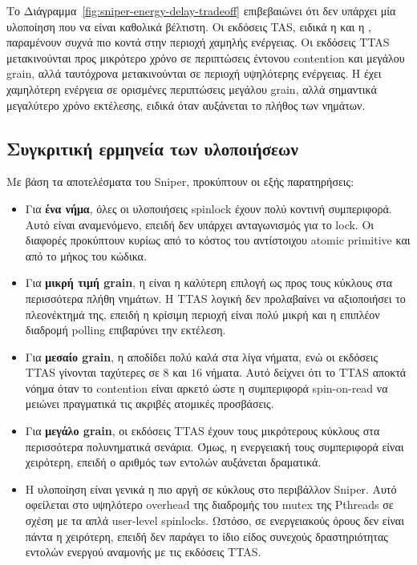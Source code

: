 \documentclass{article}
\newcommand{\code}[1]{\texttt{\detokenize{#1}}}
\begin{document}
Το Διάγραμμα~\ref{fig:sniper-energy-delay-tradeoff} επιβεβαιώνει ότι δεν υπάρχει μία υλοποίηση που να είναι καθολικά βέλτιστη. Οι εκδόσεις TAS, ειδικά η \code{TAS_CAS} και η \code{TAS_TS}, παραμένουν συχνά πιο κοντά στην περιοχή χαμηλής ενέργειας. Οι εκδόσεις TTAS μετακινούνται προς μικρότερο χρόνο σε περιπτώσεις έντονου contention και μεγάλου grain, αλλά ταυτόχρονα μετακινούνται σε περιοχή υψηλότερης ενέργειας. Η \code{MUTEX} έχει χαμηλότερη ενέργεια σε ορισμένες περιπτώσεις μεγάλου grain, αλλά σημαντικά μεγαλύτερο χρόνο εκτέλεσης, ειδικά όταν αυξάνεται το πλήθος των νημάτων.

\subsection{Συγκριτική ερμηνεία των υλοποιήσεων}

Με βάση τα αποτελέσματα του Sniper, προκύπτουν οι εξής παρατηρήσεις:

\begin{itemize}
\item Για \textbf{ένα νήμα}, όλες οι υλοποιήσεις spinlock έχουν πολύ κοντινή συμπεριφορά. Αυτό είναι αναμενόμενο, επειδή δεν υπάρχει ανταγωνισμός για το lock. Οι διαφορές προκύπτουν κυρίως από το κόστος του αντίστοιχου atomic primitive και από το μήκος του κώδικα.


\item Για \textbf{μικρή τιμή grain}, η \code{TAS\_CAS} είναι η καλύτερη επιλογή ως προς τους κύκλους στα περισσότερα πλήθη νημάτων. Η TTAS λογική δεν προλαβαίνει να αξιοποιήσει το πλεονέκτημά της, επειδή η κρίσιμη περιοχή είναι πολύ μικρή και η επιπλέον διαδρομή polling επιβαρύνει την εκτέλεση.

\item Για \textbf{μεσαίο grain}, η \code{TAS\_TS} αποδίδει πολύ καλά στα λίγα νήματα, ενώ οι εκδόσεις TTAS γίνονται ταχύτερες σε \(8\) και \(16\) νήματα. Αυτό δείχνει ότι το TTAS αποκτά νόημα όταν το contention είναι αρκετό ώστε η συμπεριφορά spin-on-read να μειώνει πραγματικά τις ακριβές ατομικές προσβάσεις.

\item Για \textbf{μεγάλο grain}, οι εκδόσεις TTAS έχουν τους μικρότερους κύκλους στα περισσότερα πολυνηματικά σενάρια. Όμως, η ενεργειακή τους συμπεριφορά είναι χειρότερη, επειδή ο αριθμός των εντολών αυξάνεται δραματικά.

\item Η υλοποίηση \code{MUTEX} είναι γενικά η πιο αργή σε κύκλους στο περιβάλλον Sniper. Αυτό οφείλεται στο υψηλότερο overhead της διαδρομής του mutex της Pthreads σε σχέση με τα απλά user-level spinlocks. Ωστόσο, σε ενεργειακούς όρους δεν είναι πάντα η χειρότερη, επειδή δεν παράγει το ίδιο είδος συνεχούς δραστηριότητας εντολών ενεργού αναμονής με τις εκδόσεις TTAS.


\end{itemize}
\end{document}
